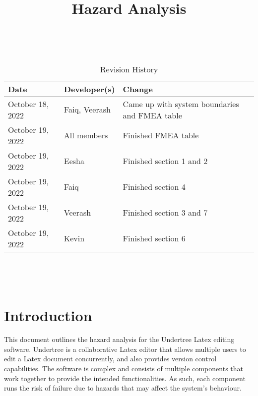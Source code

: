 \documentclass{article}
\title{Hazard Analysis\\\progname}
\author{\authname}
\date{}
\begin{document}
	
	\maketitle
	\thispagestyle{empty}
	
	~\newpage
	
	
	\begin{table}[H]
		\caption{Revision History} \label{TblRevisionHistory}
		\begin{tabularx}{\textwidth}{llX}
			\toprule
			\textbf{Date} & \textbf{Developer(s)} & \textbf{Change}\\
			\midrule
			October 18, 2022 & Faiq, Veerash & Came up with system boundaries and FMEA table\\
			October 19, 2022 & All members & Finished FMEA table\\
			October 19, 2022 & Eesha & Finished section 1 and 2\\
			October 19, 2022 & Faiq & Finished section 4\\
			October 19, 2022 & Veerash & Finished section 3 and 7\\
			October 19, 2022 & Kevin & Finished section 6\\
			\bottomrule
		\end{tabularx}
	\end{table}
	
	~\newpage
	
	\tableofcontents
	
	~\newpage
	
	
	
	\section{Introduction}
	
	This document outlines the hazard analysis for the Undertree Latex editing software. Undertree is a collaborative Latex editor that allows multiple users to edit a Latex document concurrently, and also provides version control capabilities. The software is complex and consists of multiple components that work together to provide the intended functionalities. As such, each component runs the risk of failure due to hazards that may affect the system's behaviour.\\
	
\end{document}
